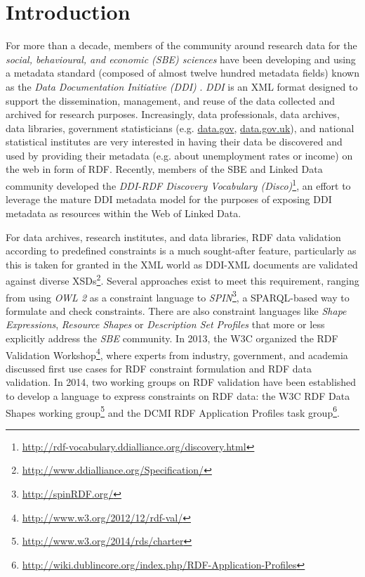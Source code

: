 \documentclass{llncs}
\newcommand{\tb}[1]{\todo[size=\small, color=green!40]{\textbf{Thomas:} #1}}
\begin{document}
\section{Introduction}


For more than a decade, members of the community around research data for the \emph{social, behavioural, and economic (SBE) sciences} have been developing and using a
metadata standard (composed of almost twelve hundred metadata fields) known as the \emph{Data Documentation Initiative (DDI)} \cite{Vardigan2008}.
\emph{DDI} is an XML format designed to support the dissemination, management,
and reuse of the data collected and archived for research purposes.  
Increasingly, data professionals, data archives, data libraries, government statisticians (e.g. \url{data.gov}, \url{data.gov.uk}), and national statistical institutes
are very interested in having their data be discovered and used by providing their metadata (e.g. about unemployment rates or income) on the web in form of RDF.
Recently, members of the SBE and Linked Data community developed the \emph{DDI-RDF Discovery Vocabulary (Disco)}\footnote{\url{http://rdf-vocabulary.ddialliance.org/discovery.html}}, 
an effort to leverage the mature DDI metadata model for the purposes of exposing DDI metadata as resources within the Web of Linked Data. 

For data archives, research institutes, and data libraries,
RDF data validation according to predefined constraints is a much sought-after feature, 
particularly as this is taken for granted in the XML world as DDI-XML documents are validated against diverse XSDs\footnote{\label{fnt:DDI-XSDs}\url{http://www.ddialliance.org/Specification/}}.
Several approaches exist to meet this requirement, ranging from using \emph{OWL 2} as a constraint language to \emph{SPIN}\footnote{\url{http://spinRDF.org/}}, a SPARQL-based way to formulate and check constraints. 
There are also constraint languages like \emph{Shape Expressions}, \emph{Resource Shapes} or \emph{Description Set Profiles} that more or less explicitly address the \emph{SBE} community.
In 2013, the W3C organized the RDF Validation Workshop\footnote{\url{http://www.w3.org/2012/12/rdf-val/}}, 
where experts from industry, government, and academia discussed first use cases for RDF constraint formulation and RDF data validation.
In 2014, two working groups on RDF validation have been established to develop a language to express constraints on RDF data: 
the W3C RDF Data Shapes working group\footnote{\url{http://www.w3.org/2014/rds/charter}} and the DCMI RDF Application Profiles task group\footnote{\url{http://wiki.dublincore.org/index.php/RDF-Application-Profiles}}. 
\end{document}
